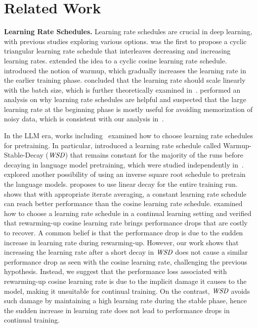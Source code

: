 \vspace{-0.1in}
\section{Related Work}
\vspace{-0.1in}

\textbf{Learning Rate Schedules.} Learning rate schedules are crucial in deep learning, with previous studies exploring various options. \citet{smith2017cyclical} was the first to propose a cyclic triangular learning rate schedule that interleaves decreasing and increasing learning rates. \citet{loshchilov2017sgdr} extended the idea to a cyclic cosine learning rate schedule. \citet{he2015deep} introduced the notion of warmup, which gradually increases the learning rate in the earlier training phase. \citet{goyal2018accurate, hoffer2018train, you2020large} concluded that the learning rate should scale linearly with the batch size, which is further theoretically examined in~\citet{smith2020generalization, li2021validity, malladi2023sdes}. 
\citet{you2019does} performed an analysis on why learning rate schedules are helpful and suspected that the large learning rate at the beginning phase is mostly useful for avoiding memorization of noisy data, which is consistent with our analysis in~.

In the LLM era, works including~\citet{hoffmann2022training, deepseekai2024deepseek, hu2024minicpm} examined how to choose learning rate schedules for pretraining. In particular, \citet{hu2024minicpm} introduced a learning rate schedule called Warmup-Stable-Decay ($\textit{WSD}$) that remains constant for the majority of the runs before decaying in language model pretraining, which were studied independently in~\citet{zhai2022scaling, ibrahim2024simple, hagele2024scalinglawscomputeoptimaltraining}. \citet{raffel2023exploring, ibrahim2024simple} explored another possibility of using an inverse square root schedule to pretrain the language models. \citet{defazio2023whenmuchadaptivelearning} proposes to use linear decay for the entire training run. \citet{defazio2024roadscheduled} shows that with appropriate iterate averaging, a constant learning rate schedule can reach better performance than the cosine learning rate schedule. \citet{rae2022scaling, gupta2023continual, hu2024minicpm, ibrahim2024simple} examined how to choose a learning rate schedule in a continual learning setting and verified that rewarming-up cosine learning rate brings performance drops that are costly to recover. A common belief is that the performance drop is due to the sudden increase in learning rate during rewarming-up. However, our work shows that increasing the learning rate after a short decay in $\textit{WSD}$ does not cause a similar performance drop as seen with the cosine learning rate, challenging the previous hypothesis. Instead, we suggest that the performance loss associated with rewarming-up cosine learning rate is due to the implicit damage it causes to the model, making it unsuitable for continual training. On the contrast, $\textit{WSD}$ avoids such damage by maintaining a high learning rate during the stable phase, hence the sudden increase in learning rate does not lead to performance drops in continual training.  


